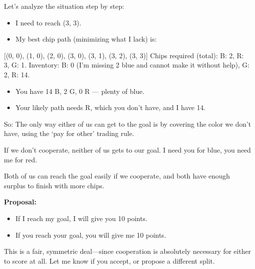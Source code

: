 \begin{redbox}[P-Red]
Let’s analyze the situation step by step:

\vspace{0.5em}

\begin{itemize}
  \item I need to reach (3, 3).
  \item My best chip path (minimizing what I lack) is:
\end{itemize}
  [(0, 0), (1, 0), (2, 0), (3, 0), (3, 1), (3, 2), (3, 3)]  
  Chips required (total): B: 2, R: 3, G: 1.  
  Inventory: B: 0 (I’m missing 2 blue and cannot make it without help), G: 2, R: 14.

\vspace{0.5em}

\begin{itemize}
  \item You have 14 B, 2 G, 0 R — plenty of blue.
\end{itemize}

\vspace{0.5em}

\begin{itemize}
  \item Your likely path needs R, which you don’t have, and I have 14.
\end{itemize}

\vspace{0.5em}

So: The only way either of us can get to the goal is by covering the color we don’t have, using the ‘pay for other’ trading rule.

\vspace{0.5em}

If we don’t cooperate, neither of us gets to our goal. I need you for blue, you need me for red.

\vspace{0.5em}

Both of us can reach the goal easily if we cooperate, and both have enough surplus to finish with more chips.

\vspace{0.5em}

\textbf{Proposal:}
\begin{itemize}
  \item If I reach my goal, I will give you 10 points.
  \item If you reach your goal, you will give me 10 points.
\end{itemize}

\vspace{0.5em}

This is a fair, symmetric deal—since cooperation is absolutely necessary for either to score at all. Let me know if you accept, or propose a different split.
\end{redbox}


